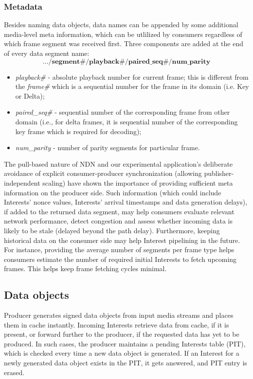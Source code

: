 \documentclass{icn/sig-alternate-2012} %
\begin{document}
\subsubsection{Metadata} 

Besides naming data objects, data names can be appended by some additional media-level meta information, which can be utlilized by consumers regardless of which frame segment was received first. Three components are added at the end of every data segment name:
\small\begin{equation}
.../\textbf{segment\#}/\textbf{playback\#}/\textbf{paired\_seq\#}/\textbf{num\_parity} \nonumber
\end{equation}\normalsize
\begin{itemize}[label={}]
\item \textit{playback\#} - absolute playback number for current frame; this is different from the \textit{frame\#} which is a sequential number for the frame in its domain (i.e. Key or Delta);
\item \textit{paired\_seq\#} - sequential number of the corresponding frame from other domain (i.e., for delta frames, it is sequential number of the corresponding key frame which is required for decoding);
\item \textit{num\_parity} - number of parity segments for particular frame.
\end{itemize}

The pull-based nature of NDN and our experimental application's deliberate avoidance of explicit consumer-producer synchronization (allowing publisher-independent scaling) have shown the importance of providing sufficient meta information on the producer side. Such information (which could include Interests' nonce values, Interests' arrival timestamps and data generation delays), if added to the returned data segment, may help consumers evaluate relevant network performance, detect congestion and assess whether incoming data is likely to be stale (delayed beyond the path delay). Furthermore, keeping historical data on the consumer side may help Interest pipelining in the future. For instance, providing the average number of segments per frame type helps consumers estimate the number of required initial Interests to fetch upcoming frames. This helps keep frame fetching cycles minimal.


\subsection{Data objects}
Producer generates signed data objects from input media streams and places them in cache instantly. Incoming Interests retrieve data from cache, if it is present, or forward further to the producer, if the requested data has yet to be produced. In such cases, the producer maintains a pending Interests table (PIT), which is checked every time a new data object is generated. If an Interest for a newly generated data object exists in the PIT, it gets answered, and PIT entry is erased.
\end{document}

